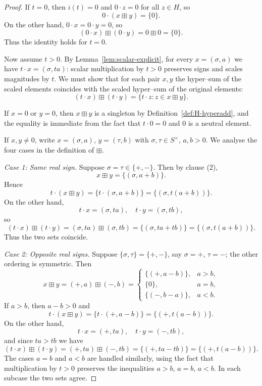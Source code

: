 \documentclass[11pt]{amsart}
\numberwithin{equation}{section}
\theoremstyle{definition}
\theoremstyle{remark}
\newcommand{\Hnum}{H}                      %
\newcommand{\Snon}{S^{\times}}             %
\newcommand{\op}{\boxplus}                 %
\newcommand{\iemb}{i}                      %
\begin{document}
\begin{proof}
If $t=0$, then $\iemb(t)=0$ and $0\cdot z=0$ for all $z\in\Hnum$, so
\[
  0\cdot(x\op y) = \{0\}.
\]
On the other hand, $0\cdot x=0\cdot y=0$, so
\[
  (0\cdot x)\op(0\cdot y) = 0\op 0 = \{0\}.
\]
Thus the identity holds for $t=0$.

Now assume $t>0$.  By Lemma~\ref{lem:scalar-explicit}, for every
$x=(\sigma,a)$ we have $t\cdot x=(\sigma,ta)$: scalar multiplication by
$t>0$ preserves signs and scales magnitudes by $t$.  We must show that
for each pair $x,y$ the hyper–sum of the scaled elements coincides with
the scaled hyper–sum of the original elements:
\[
  (t\cdot x)\op(t\cdot y)
  = \{t\cdot z : z\in x\op y\}.
\]

If $x=0$ or $y=0$, then $x\op y$ is a singleton by
Definition~\ref{def:H-hyperadd}, and the equality is immediate from
the fact that $t\cdot 0=0$ and $0$ is a neutral element.

If $x,y\ne0$, write $x=(\sigma,a)$, $y=(\tau,b)$ with
$\sigma,\tau\in\Snon$, $a,b>0$.  We analyse the four cases in the
definition of $\op$.

\smallskip\noindent
\emph{Case 1: Same real sign.}  Suppose $\sigma=\tau\in\{+,-\}$.  Then
by clause (2),
\[
  x\op y = \{(\sigma,a+b)\}.
\]
Hence
\[
  t\cdot(x\op y)
  = \{t\cdot(\sigma,a+b)\}
  = \{(\sigma,t(a+b))\}.
\]
On the other hand,
\[
  t\cdot x = (\sigma,ta),\quad
  t\cdot y = (\sigma,tb),
\]
so
\[
  (t\cdot x)\op(t\cdot y)
  = (\sigma,ta)\op(\sigma,tb)
  = \{(\sigma,ta+tb)\}
  = \{(\sigma,t(a+b))\}.
\]
Thus the two sets coincide.

\smallskip\noindent
\emph{Case 2: Opposite real signs.}  Suppose $\{\sigma,\tau\}=\{+,-\}$,
say $\sigma=+$, $\tau=-$; the other ordering is symmetric.  Then
\[
  x\op y
  = (+,a)\op(-,b)
  =
  \begin{cases}
    \{(+,a-b)\}, & a>b,\\[2pt]
    \{0\},       & a=b,\\[2pt]
    \{(-,b-a)\}, & a<b.
  \end{cases}
\]
If $a>b$, then $a-b>0$ and
\[
  t\cdot(x\op y)
  = \{t\cdot(+,a-b)\}
  = \{(+,t(a-b))\}.
\]
On the other hand,
\[
  t\cdot x = (+,ta),\quad
  t\cdot y = (-,tb),
\]
and since $ta>tb$ we have
\[
  (t\cdot x)\op(t\cdot y)
  = (+,ta)\op(-,tb)
  = \{(+,ta-tb)\}
  = \{(+,t(a-b))\}.
\]
The cases $a=b$ and $a<b$ are handled similarly, using the fact that
multiplication by $t>0$ preserves the inequalities $a>b$, $a=b$,
$a<b$.  In each subcase the two sets agree.


\end{proof}
\end{document}
